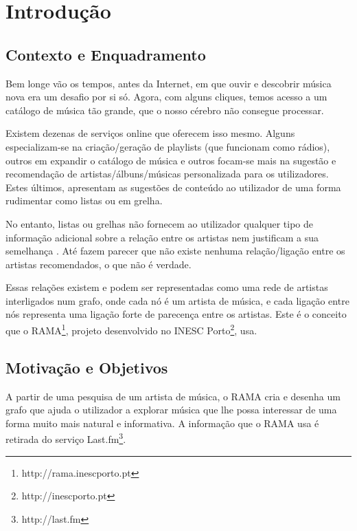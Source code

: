 
\chapter{Introdução} \label{chap:intro}


\section*{}

\section{Contexto e Enquadramento} \label{sec:context}

Bem longe vão os tempos, antes da Internet, em que ouvir e descobrir música nova era um desafio por si só.
Agora, com alguns cliques, temos acesso a um catálogo de música tão grande, que o nosso cérebro não consegue processar.

Existem dezenas de serviços online que oferecem isso mesmo.
Alguns especializam-se na criação/geração de playlists (que funcionam como rádios), outros em expandir o catálogo de música e outros focam-se mais na sugestão e recomendação de artistas/álbuns/músicas personalizada para os utilizadores.
Estes últimos, apresentam as sugestões de conteúdo ao utilizador de uma forma rudimentar como listas ou em grelha.

No entanto, listas ou grelhas não fornecem ao utilizador qualquer tipo de informação adicional sobre a relação entre os artistas nem justificam a sua semelhança \cite{Lamere2008}.
Até fazem parecer que não existe nenhuma relação/ligação entre os artistas recomendados, o que não é verdade.

Essas relações existem e podem ser representadas como uma rede de artistas interligados num grafo, onde cada nó é um artista de música, e cada ligação entre nós representa uma ligação forte de parecença entre os artistas.
Este é o conceito que o RAMA\footnote{http://rama.inescporto.pt}, projeto desenvolvido no INESC Porto\footnote{http://inescporto.pt}, usa. \cite{Costa2008} \cite{Sarmento2009} \cite{Costa2009} \cite{Gouyon2011}


\section{Motivação e Objetivos} \label{sec:goals}


A partir de uma pesquisa de um artista de música, o RAMA cria e desenha um grafo que ajuda o utilizador a explorar música que lhe possa interessar de uma forma muito mais natural e informativa.
A informação que o RAMA usa é retirada do serviço Last.fm\footnote{http://last.fm}.

